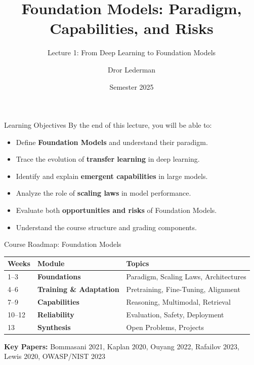 \documentclass[aspectratio=169,10pt]{beamer}
\title{Foundation Models: Paradigm, Capabilities, and Risks}
\subtitle{Lecture 1: From Deep Learning to Foundation Models}
\author[D. Lederman]{Dror Lederman}
\institute{Holon Institute of Technology (HIT)}
\date{Semester 2025}
\begin{document}
\begin{frame}
  \titlepage
\end{frame}

\begin{frame}{Learning Objectives}
  By the end of this lecture, you will be able to:

  \begin{itemize}
    \item Define \textbf{Foundation Models} and understand their paradigm.
    \item Trace the evolution of \textbf{transfer learning} in deep learning.
    \item Identify and explain \textbf{emergent capabilities} in large models.
    \item Analyze the role of \textbf{scaling laws} in model performance.
    \item Evaluate both \textbf{opportunities and risks} of Foundation Models.
    \item Understand the course structure and grading components.
  \end{itemize}
\end{frame}

\begin{frame}{Course Roadmap: Foundation Models}
  \begin{center}
    \small
    \begin{tabular}{lll}
      \toprule
      \textbf{Weeks} & \textbf{Module} & \textbf{Topics} \\
      \midrule
      1--3 & \textbf{Foundations} & Paradigm, Scaling Laws, Architectures \\
      4--6 & \textbf{Training \& Adaptation} & Pretraining, Fine-Tuning, Alignment \\
      7--9 & \textbf{Capabilities} & Reasoning, Multimodal, Retrieval \\
      10--12 & \textbf{Reliability} & Evaluation, Safety, Deployment \\
      13 & \textbf{Synthesis} & Open Problems, Projects \\
      \bottomrule
    \end{tabular}
  \end{center}

  \vspace{0.4cm}

  \textbf{Key Papers:} Bommasani 2021, Kaplan 2020, Ouyang 2022, Rafailov 2023, Lewis 2020, OWASP/NIST 2023
\end{frame}
\end{document}
